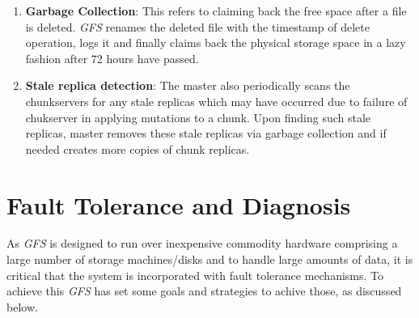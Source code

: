 \documentclass[12pt, a4paper]{article}
\begin{document}
\begin{enumerate}
        \item \textbf{Garbage Collection}: This refers to claiming back the free space after a file is deleted. \textit{GFS}\cite{Ghemawat:2003:GFS:945445.945450} renames the deleted file with the timestamp of delete operation, logs it and finally claims back the physical storage space in a lazy fashion after 72 hours have passed.

        \item \textbf{Stale replica detection}: The master also periodically scans the chunkservers for any stale replicas which may have occurred due to failure of chukserver in applying mutations to a chunk. Upon finding such stale replicas, master removes these stale replicas via garbage collection and if needed creates more copies of chunk replicas.

\end{enumerate}


\section*{Fault Tolerance and Diagnosis}
As \textit{GFS}\cite{Ghemawat:2003:GFS:945445.945450} is designed to run over inexpensive commodity hardware comprising a large number of storage machines/disks and to handle large amounts of data, it is critical that the system is incorporated with fault tolerance mechanisms. To achieve this \textit{GFS}\cite{Ghemawat:2003:GFS:945445.945450} has set some goals and strategies to achive those, as discussed below.
\end{document}
